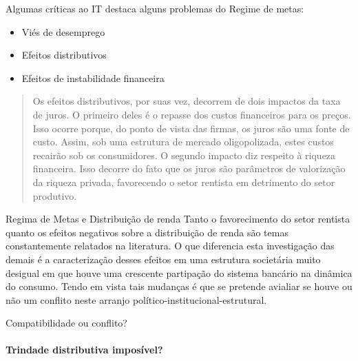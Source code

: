 \documentclass[pdf, xcolor=table]{beamer}
\begin{document}
\begin{frame}{Algumas críticas ao IT}
\textcite{Fontana} destaca alguns problemas do Regime de metas:
\begin{itemize}
	\item Viés de desemprego
	\item Efeitos distributivos
	\item Efeitos de instabilidade financeira
\end{itemize}
\vspace{1cm}
\begin{quotation}
	Os efeitos distributivos, por suas vez, decorrem de dois impactos da taxa de juros. O
	primeiro deles é o repasse dos custos financeiros para os preços. Isso ocorre porque, do ponto
	de vista das firmas, os juros são uma fonte de custo. Assim, sob uma estrutura de mercado
	oligopolizada, estes custos recairão sob os consumidores. O segundo impacto diz respeito à
	riqueza financeira. Isso decorre do fato que os juros são parâmetros de valorização da riqueza
	privada, favorecendo o setor rentista em detrimento do setor produtivo. \cite[p.~23]{Mono_Gabriel}
\end{quotation}
\end{frame}

\begin{frame}{Regima de Metas e Distribuição de renda}
Tanto o favorecimento do setor rentista quanto os efeitos negativos sobre a distribuição de renda são temas constantemente relatados na literatura. O que diferencia esta investigação das demais é a caracteriza\-ção desses efeitos em uma estrutura societária muito desigual em que houve uma crescente partipação do sistema bancário na dinâmica do consumo. Tendo em vista tais mudanças é que se pretende avialiar se houve ou não um conflito neste arranjo político-institucional-estrutural.
\end{frame}


\begin{frame}{Compatibilidade ou conflito?}
\framesubtitle{Trindade distributiva imposível?}
    \newcommand{\pythagwidth}{3cm}
\newcommand{\pythagheight}{3cm}
\end{frame}
\end{document}
